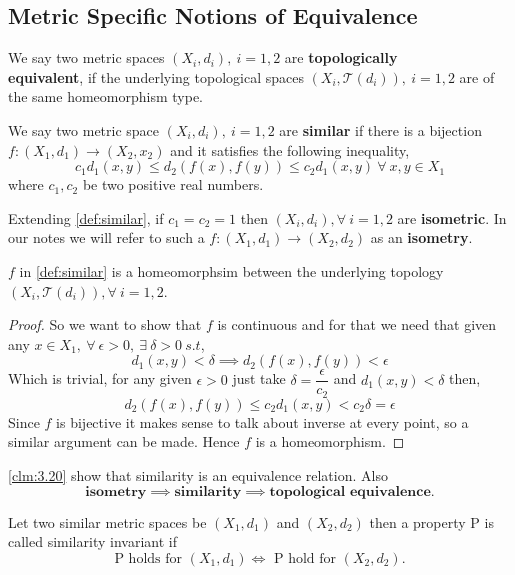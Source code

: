 \documentclass{scrartcl} %
\newcommand{\Tau}{\mathcal{T}}
\begin{document}
\subsection{Metric Specific Notions of Equivalence}
\begin{definition}
We say two metric spaces $\left(X_i, d_i\right),\ i = 1,2$ are \textbf{topologically} \\ \textbf{equivalent}, if
	the underlying topological spaces $\left(X_i, \Tau(d_i)\right),\ i = 1,2$ are of the
	same homeomorphism type.
\end{definition}
\begin{definition}\label{def:similar}
	We say two metric space $\left(X_i, d_i\right),\ i = 1,2$ are \textbf{similar} if there is a 
	bijection $f: (X_1,d_1) \rightarrow (X_2,x_2)$ and it satisfies the following inequality, 
	\[
		c_1d_1(x,y) \leq d_2(f(x),f(y)) \leq c_2d_1(x,y) \ \forall\ x,y \in X_1
	\]
where $c_1, c_2$ be two positive real numbers.
\end{definition}
\begin{definition}
	Extending \autoref{def:similar}, if $c_1 = c_2 = 1$ then $\left(X_i, d_i\right), \forall\ i = 1,2$ are
	\textbf{isometric}. In our notes we will refer to such a $f:(X_1, d_1) \rightarrow (X_2, d_2)$ as
	an \textbf{isometry}.
\end{definition}
\begin{claim}\label{clm:3.20}
	$f$ in \autoref{def:similar} is a homeomorphsim between the underlying topology $\left(X_i, \Tau(d_i)\right),
\forall\ i = 1,2$.  
\end{claim}
\begin{proof}
So we want to show that $f$ is continuous and for that
we need that given any $x \in X_1, \ \forall\
\epsilon > 0, \ \exists\ \delta > 0 \  s.t$,
\[
	d_1(x,y) < \delta \implies
	d_2(f(x),f(y)) < \epsilon
\]
Which is trivial, for any given $\epsilon > 0$
just take 
$\delta = \dfrac{\epsilon}{c_2}$ and $ d_1(x,y) < \delta
$ then,
\[
d_2(f(x), f(y)) \leq c_2d_1(x,y) < c_2\delta = \epsilon
\]
Since $f$ is bijective it makes sense to talk about 
inverse at every point, so a similar argument can be 
made. Hence $f$ is a homeomorphism.
\end{proof}
\begin{remark}
	\autoref{clm:3.20} show that similarity is an 
	equivalence relation. Also
	\[
		\textbf{isometry} \implies 
		\textbf{similarity} \implies
		\textbf{topological equivalence}.
        \]
\end{remark}
\begin{remark}
	Let two similar metric spaces be $\left(X_1, d_1\right)$ and $\left(X_2, d_2\right)$ then a property
	P is called similarity invariant if
	\[
		\text{P holds for } \left(X_1, d_1\right) \iff \text{ P hold for }\left(X_2, d_2\right).
        \]
\end{remark}
\end{document}
